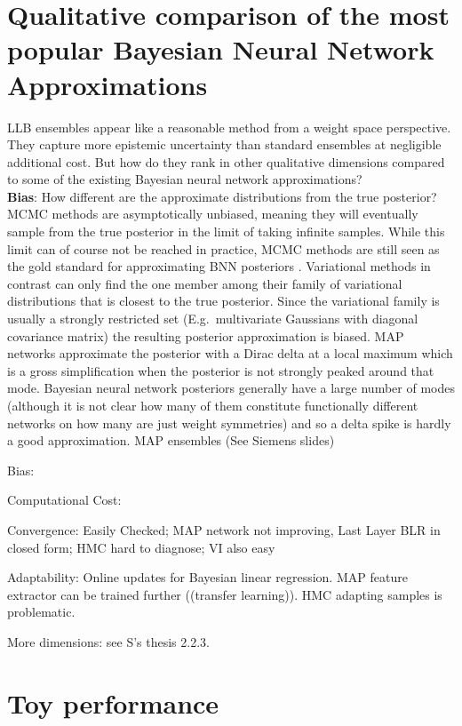 \documentclass[../thesis.tex]{subfiles}
\begin{document}
\section{Qualitative comparison of the most popular Bayesian Neural Network Approximations}
LLB ensembles appear like a reasonable method from a weight space perspective. They capture more epistemic uncertainty than standard ensembles at negligible additional cost. But how do they rank in other qualitative dimensions compared to some of the existing Bayesian neural network approximations?\\
\textbf{Bias}:
How different are the approximate distributions from the true posterior? MCMC methods are asymptotically unbiased, meaning they will eventually sample from the true posterior in the limit of taking infinite samples. While this limit can of course not be reached in practice, MCMC methods are still seen as the gold standard for approximating BNN posteriors \parencite{yao2019quality, gal2018sufficient}. Variational methods in contrast can only find the one member among their family of variational distributions that is closest to the true posterior. Since the variational family is usually a strongly restricted set (E.g.\ multivariate Gaussians with diagonal covariance matrix) the resulting posterior approximation is biased. MAP networks approximate the posterior with a Dirac delta at a local maximum which is a gross simplification when the posterior is not strongly peaked around that mode. Bayesian neural network posteriors generally have a large number of modes (although it is not clear how many of them constitute functionally different networks on how many are just weight symmetries) and so a delta spike is hardly a good approximation. MAP ensembles
(See Siemens slides)

Bias:

Computational Cost: 

Convergence:  Easily Checked; MAP network not improving, Last Layer BLR in closed form; HMC hard to diagnose; VI also easy

Adaptability: Online updates for Bayesian linear regression. MAP feature extractor can be trained further ((transfer learning)). HMC adapting samples is problematic.

More dimensions: see S's thesis 2.2.3.




\section{Toy performance}
\end{document}

